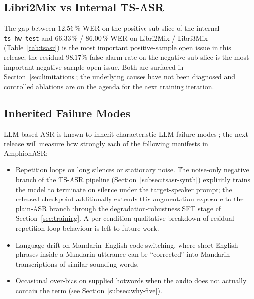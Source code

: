 \subsection{Libri2Mix vs Internal TS-ASR}

The gap between $12.56$\,\% WER on the positive sub-slice of the
internal \texttt{ts\_hw\_test} and $66.33$\,\% / $86.00$\,\% WER
on Libri2Mix / Libri3Mix (Table~\ref{tab:tsasr}) is the most
important positive-sample open issue in this release; the residual
$98.17\%$ false-alarm rate on the negative sub-slice is the most
important negative-sample open issue. Both are surfaced in
Section~\ref{sec:limitations}; the underlying causes have not been
diagnosed and controlled ablations are on the agenda for the next
training iteration.

\subsection{Inherited Failure Modes}

LLM-based ASR is known to inherit characteristic LLM failure modes
\cite{radford2023whisper, chu2023qwenaudio}; the next release will
measure how strongly each of the following manifests in
AmphionASR:

\begin{itemize}
  \item Repetition loops on long silences or stationary noise. The
        noise-only negative branch of the TS-ASR pipeline
        (Section~\ref{subsec:tsasr-synth}) explicitly trains the
        model to terminate on silence under the target-speaker
        prompt; the released checkpoint additionally extends this
        augmentation exposure to the plain-ASR branch through the
        degradation-robustness SFT stage of Section~\ref{sec:training}. A
        per-condition qualitative breakdown of residual
        repetition-loop behaviour is left to future work.
  \item Language drift on Mandarin--English code-switching, where
        short English phrases inside a Mandarin utterance can be
        ``corrected'' into Mandarin transcriptions of
        similar-sounding words.
  \item Occasional over-bias on supplied hotwords when the audio
        does not actually contain the term (see
        Section~\ref{subsec:why-five}).
\end{itemize}
